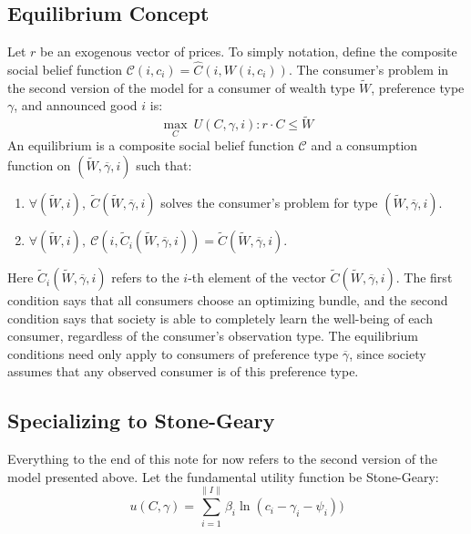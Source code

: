 \documentclass{article}
\begin{document}
\subsection{Equilibrium Concept}
Let $r$ be an exogenous vector of prices.  
To simply notation, define the composite social belief function $\mathcal{C}(i,c_i)=\hat{C}(i,W(i,c_i))$. 
%
The consumer's problem in the second version of the model for a consumer of wealth type $\tilde{W}$, preference type $\gamma$, and announced good $i$ is:
\[ \max_C \ U(C,\gamma,i) :  r\cdot C \le \tilde{W}\]
An equilibrium is a composite social belief function $\mathcal{C}$ and a consumption function on $(\tilde{W},\overline{\gamma},i)$ such that:
\begin{enumerate}
	\item $\forall (\tilde{W},i), \ \tilde{C}(\tilde{W},\overline{\gamma},i)$ solves the consumer's problem for type $(\tilde{W},\overline{\gamma},i)$.
	\item $\forall (\tilde{W},i), \ \mathcal{C}(i,\tilde{C}_i(\tilde{W},\overline{\gamma},i)) = \tilde{C}(\tilde{W},\overline{\gamma},i).$
\end{enumerate}
Here $\tilde{C}_i(\tilde{W},\overline{\gamma},i)$ refers to the $i$-th element of the vector $\tilde{C}(\tilde{W},\overline{\gamma},i)$.
The first condition says that all consumers choose an optimizing  bundle, and the second condition says that society is able to completely learn the well-being of each consumer, regardless of the consumer's observation type.
The equilibrium conditions need only apply to consumers of preference type $\overline{\gamma}$, since society assumes that any observed consumer is of this preference type.   
\subsection{Specializing to Stone-Geary}
Everything to the end of this note for now refers to the second version of the model presented above.  
Let the fundamental utility function be Stone-Geary:
\[u(C,\gamma) = \sum_{i=1}^{\|I\|} \beta_i \ln(c_i - \gamma_i - \psi_i))\]
\end{document}

